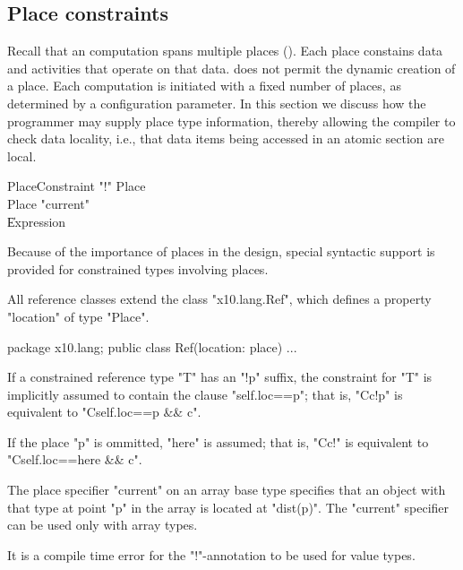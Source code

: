 \subsection{Place constraints}\label{PlaceTypes}
\label{DepType:PlaceType}

Recall that an \Xten{} computation spans multiple places
(). Each place constains data and activities that
operate on that data.  \XtenCurrVer{} does not permit the dynamic
creation of a place. Each \Xten{} computation is initiated with a
fixed number of places, as determined by a configuration parameter.
In this section we discuss how the programmer may supply place type
information, thereby allowing the compiler to check data locality,
i.e., that data items being accessed in an atomic section are local.

\begin{grammar}
PlaceConstraint     \: \xcd"!" Place\opt \\
Place              \:  \xcd"current" \\
                        \| Expression \\
\end{grammar}

Because of the importance of places in the \Xten{} design, special
syntactic support is provided for constrained types involving places.

All \Xten{} reference classes extend the class
\xcd"x10.lang.Ref", which defines a property
\xcd"location" of type
\xcd"Place".

\begin{xten}
package x10.lang;
public class Ref(location: place) { ... }  
\end{xten}

If a constrained reference type \xcd"T" has an \xcd"!p" suffix,
the constraint for \xcd"T" is implicitly assumed to contain the clause
\xcd"self.loc==p"; that is,
\xcd"C{c}!p" is equivalent to \xcd"C{self.loc==p && c}".

If the place \xcd"p" is ommitted, \xcd"here" is assumed; that is,
\xcd"C{c}!" is equivalent to \xcd"C{self.loc==here && c}".


The place specifier \xcd"current" on an array base type
specifies that an object with that type at point \xcd"p"
in the array 
is located at \xcd"dist(p)".  The \xcd"current" specifier can be
used only with array types.

\begin{staticrule*}
  It is a compile time error for the \xcd"!"-annotation to
  be used for value types.
\end{staticrule*}

